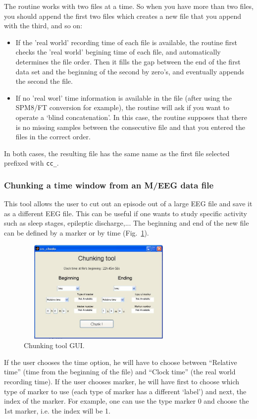 \documentclass[a4paper,titlepage]{article}
\newcommand{\bi}{\begin{itemize}}
\newcommand{\ei}{\end{itemize}}
\begin{document}
The routine works with two files at a time. So when you have more than two files, you should append the first two files which creates a new file that you append with the third, and so on:
\bi
\item If the 'real world' recording time of each file is available, the routine first checks the 'real world' begining time of each file, and automatically determines the file order. Then it fills the gap between the end of the first data set and the beginning of the second by zero's, and eventually appends the second the file.
\item If no 'real worl' time information is available in the file (after using the SPM8/FT conversion for example), the routine will ask if you want to operate a `blind concatenation'. In this case, the routine supposes that there is no missing samples between the consecutive file and that you entered the files in the correct order.
\ei
In both cases, the resulting file has the same name as the first file selected prefixed with {\tt cc\_}. 

\subsubsection{Chunking a time window from an M/EEG data file}
\label{sec:chunking}
This tool allows the user to cut out an episode out of a large EEG file and save it as a different EEG file. This can be useful if one wants to study specific activity such as sleep stages, epileptic discharge,... The beginning and end of the new file can be defined by a marker or by time (Fig.~\ref{fig:TB_chunk}).

\begin{figure}[ht]
	\centering
		\includegraphics[width=8cm,height=5cm]{images/FIG10_crc_chunk.jpg}
	\caption{Chunking tool GUI.
	\label{fig:TB_chunk}}
\end{figure}

If the user chooses the time option, he will have to choose between ``Relative time'' (time from the beginning of the file) and ``Clock time'' (the real world recording time). If the user chooses marker, he will have first to choose which type of marker to use (each type of marker has a different `label') and next, the index of the marker. For example, one can use the type marker 0 and choose the 1st marker, i.e. the index will be 1.
\end{document}
